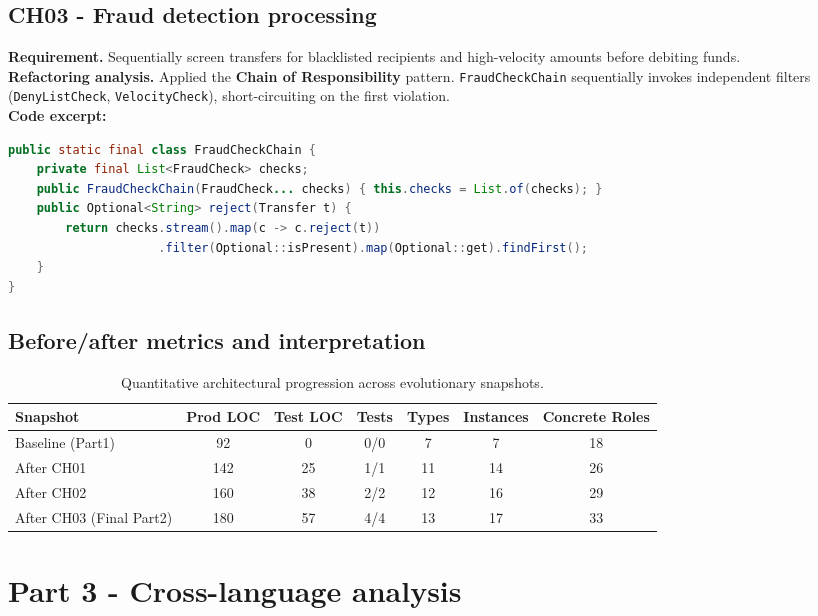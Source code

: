 \documentclass[11pt,a4paper]{article}
\begin{document}
\subsection{CH03 - Fraud detection processing}
\textbf{Requirement.} Sequentially screen transfers for blacklisted recipients and high-velocity amounts before debiting funds.\\
\textbf{Refactoring analysis.} Applied the \textbf{Chain of Responsibility} pattern. \texttt{FraudCheckChain} sequentially invokes independent filters (\texttt{DenyListCheck}, \texttt{VelocityCheck}), short-circuiting on the first violation.\\
\textbf{Code excerpt:}
\begin{lstlisting}[language=Java]
public static final class FraudCheckChain {
    private final List<FraudCheck> checks;
    public FraudCheckChain(FraudCheck... checks) { this.checks = List.of(checks); }
    public Optional<String> reject(Transfer t) { 
        return checks.stream().map(c -> c.reject(t))
                     .filter(Optional::isPresent).map(Optional::get).findFirst(); 
    }
}
\end{lstlisting}

\subsection{Before/after metrics and interpretation}
\begin{table}[h!]
\centering
\small
\begin{tabular}{lcccccc}
\toprule
\textbf{Snapshot} & \textbf{Prod LOC} & \textbf{Test LOC} & \textbf{Tests} & \textbf{Types} & \textbf{Instances} & \textbf{Concrete Roles} \\
\midrule
Baseline (Part1) & 92 & 0 & 0/0 & 7 & 7 & 18 \\
After CH01 & 142 & 25 & 1/1 & 11 & 14 & 26 \\
After CH02 & 160 & 38 & 2/2 & 12 & 16 & 29 \\
After CH03 (Final Part2) & 180 & 57 & 4/4 & 13 & 17 & 33 \\
\bottomrule
\end{tabular}
\caption{Quantitative architectural progression across evolutionary snapshots.}
\end{table}

\section{Part 3 - Cross-language analysis}
\end{document}
